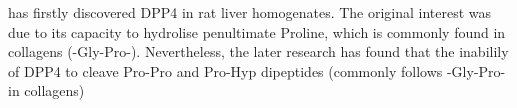 \citet{Hopsu-Havu1966} has firstly discovered DPP4 in rat liver homogenates. The original interest was due to its capacity to hydrolise penultimate Proline, which is commonly found in collagens (-Gly-Pro-). Nevertheless, the later research has found that the inabilily of DPP4 to cleave Pro-Pro and Pro-Hyp dipeptides (commonly follows -Gly-Pro- in collagens) 